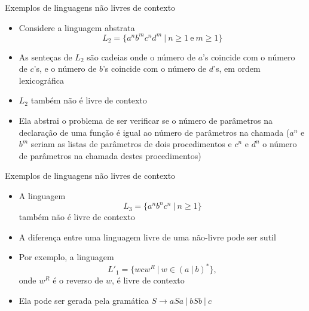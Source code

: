\begin{frame}[fragile]{Exemplos de linguagens não livres de contexto}

    \begin{itemize}
        \item Considere a linguagem abstrata
        \[
            L_2 = \{ a^nb^mc^nd^m\ |\ n \geq 1\ \mbox{e}\ m\geq 1\}
        \]

        \item As senteças de $L_2$ são cadeias onde o número de $a$'s coincide com o número de $c$'s, e o número de $b$'s coincide com o número de $d$'s, em ordem
            lexicográfica

        \item $L_2$ também não é livre de contexto

        \item Ela abstrai o problema de ser verificar se o número de parâmetros na declaração de uma função é igual ao número de parâmetros na chamada ($a^n$ e
            $b^m$ seriam as listas de parâmetros de dois procedimentos e $c^n$ e $d^n$ o número de parâmetros na chamada destes procedimentos)
    \end{itemize}

\end{frame}

\begin{frame}[fragile]{Exemplos de linguagens não livres de contexto}

    \begin{itemize}
        \item A linguagem
        \[
            L_3 = \{ a^nb^nc^n\ |\ n\geq 1\}
        \]
        também não é livre de contexto

        \item A diferença entre uma linguagem livre de uma não-livre pode ser sutil

        \item Por exemplo, a linguagem
        \[
            L'_1 = \{ wcw^R\ |\ w\in (a\ |\ b)^*\},
        \]
        onde $w^R$ é o reverso de $w$, é livre de contexto

        \item Ela pode ser gerada pela gramática $S\to aSa\ |\ bSb\ |\ c$
    \end{itemize}

\end{frame}

